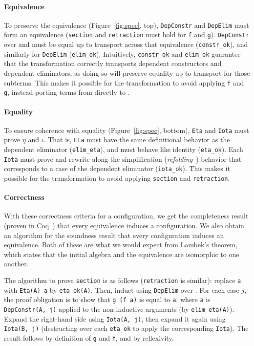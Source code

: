 \paragraph{Equivalence}
To preserve the equivalence (Figure~\ref{fig:spec}, top), \lstinline{DepConstr} and \lstinline{DepElim} must form an equivalence
(\lstinline{section} and \lstinline{retraction} must hold for \lstinline{f} and \lstinline{g}).
\lstinline{DepConstr} over \Aa and \B must be equal up to transport across that equivalence (\lstinline{constr_ok}), 
and similarly for \lstinline{DepElim} (\lstinline{elim_ok}).
Intuitively, \lstinline{constr_ok} and \lstinline{elim_ok} guarantee that the transformation
correctly transports dependent constructors and dependent eliminators,
as doing so will preserve equality up to transport for those subterms.
This makes it possible for the transformation
to avoid applying \lstinline{f} and \lstinline{g}, instead porting terms from \Aa directly to \B.

\paragraph{Equality}
To ensure coherence with equality (Figure~\ref{fig:spec}, bottom),
\lstinline{Eta} and \lstinline{Iota} must prove $\eta$ and $\iota$.
That is, \lstinline{Eta} must have the same definitional behavior as the dependent eliminator (\lstinline{elim_eta}),
and must behave like identity (\lstinline{eta_ok}).
Each \lstinline{Iota} must prove and rewrite along the simplification (\textit{refolding}~\cite{boutillier:tel-01054723}) behavior that corresponds to a case of the dependent eliminator (\lstinline{iota_ok}).
This makes it possible for the transformation to
avoid applying \lstinline{section} and \lstinline{retraction}.

\paragraph{Correctness}
With these correctness criteria for a configuration, we get the completeness result (proven in Coq~\href{https://github.com/uwplse/pumpkin-pi/blob/v2.0.0/plugin/coq/playground/arbitrary.v}{}) that every equivalence induces a configuration. %
We also obtain an algorithm for the soundness result that every configuration induces an equivalence.
Both of these are what we would expect from Lambek's theorem, which states that the initial algebra and the equivalence are isomorphic to one another.

The algorithm to prove \lstinline{section} is as follows (\lstinline{retraction} is similar):
replace \lstinline{a} with \lstinline{Eta(A) a} by \lstinline{eta_ok(A)}.
Then, induct using \lstinline{DepElim} over \Aa.
For each case $j$, the proof obligation is to show that \lstinline{g (f a)} is equal to \lstinline{a},
where \lstinline{a} is \lstinline{DepConstr(A, j)} applied to the non-inductive arguments (by \lstinline{elim_eta(A)}).
Expand the right-hand side using \lstinline{Iota(A, j)}, then expand it again using \lstinline{Iota(B, j)}
(destructing over each \lstinline{eta_ok} to apply the corresponding \lstinline{Iota}).
The result follows by definition of \lstinline{g} and \lstinline{f}, and by reflexivity.

